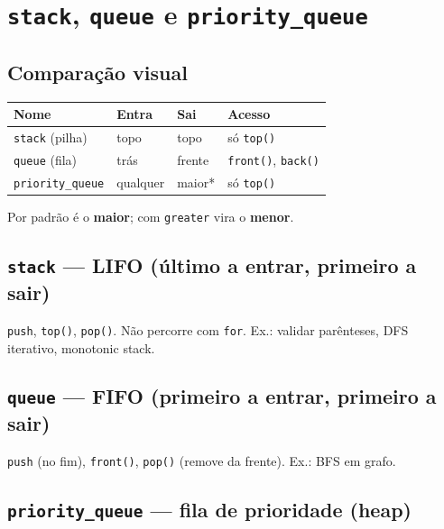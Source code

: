
\section{\texttt{stack}, \texttt{queue} e \texttt{priority\_queue}}

\subsection{Comparação visual}

\begin{center}
\small
\begin{tabular}{@{}llll@{}}
  \toprule
  \textbf{Nome} & \textbf{Entra} & \textbf{Sai} & \textbf{Acesso} \\
  \midrule
  \texttt{stack} (pilha) & topo & topo & só \texttt{top()} \\
  \texttt{queue} (fila) & trás & frente & \texttt{front()}, \texttt{back()} \\
  \texttt{priority\_queue} & qualquer & maior* & só \texttt{top()} \\
  \bottomrule
\end{tabular}
\end{center}
{\footnotesize *Por padrão é o \textbf{maior}; com \texttt{greater} vira o \textbf{menor}.}

\subsection{\texttt{stack} --- LIFO (último a entrar, primeiro a sair)}

\texttt{push}, \texttt{top()}, \texttt{pop()}. Não percorre com \texttt{for}.
Ex.: validar parênteses, DFS iterativo, monotonic stack.

\subsection{\texttt{queue} --- FIFO (primeiro a entrar, primeiro a sair)}

\texttt{push} (no fim), \texttt{front()}, \texttt{pop()} (remove da frente).
Ex.: BFS em grafo.

\subsection{\texttt{priority\_queue} --- fila de prioridade (heap)}

